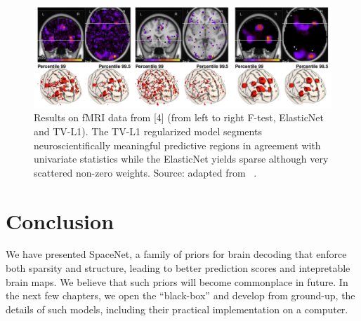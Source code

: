\begin{figure}[!htbp] 
  \includegraphics[width=1\linewidth]{figures/gramfort_tvl1.png}
  \caption{Results on fMRI data from [4] (from left to right F-test, ElasticNet and TV-L1). The TV-L1 regularized model segments neuroscientifically
    meaningful predictive regions in agreement with univariate statistics while the ElasticNet yields sparse although very scattered non-zero weights. Source: adapted from ~\citep{gramfort2013}.}
  \label{fig:tvl1_regression}
\end{figure}

\section{Conclusion}
We have presented SpaceNet, a family of priors for brain decoding that enforce both sparsity and structure, leading to better prediction scores and intepretable brain maps. We believe that such priors will become commonplace in future.
In the next few chapters, we open the ``black-box'' and develop from ground-up, the details of such models, including their practical implementation on a computer.



